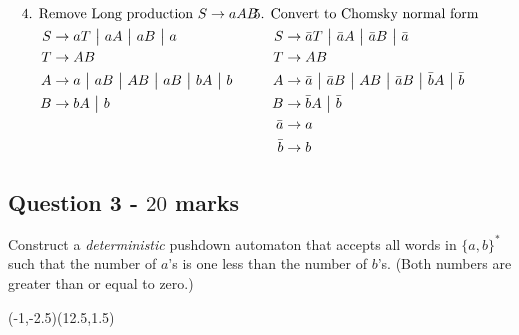 \documentclass[12pt]{article}
\begin{document}
\begin{align*}
& & &\\
&\hspace{-.75cm}\text{4. Remove Long production $S \rightarrow aAB$} & &\hspace{-.75cm}\text{5. Convert to Chomsky normal form}\\
S & \rightarrow aT \BAR aA \BAR aB \BAR a	&  S & \rightarrow \bar{a}T \BAR \bar{a}A \BAR \bar{a}B \BAR \bar{a} \\
T & \rightarrow AB												&  T & \rightarrow AB \\
A &\rightarrow a \BAR aB \BAR AB \BAR aB \BAR bA \BAR b		&  A &\rightarrow \bar{a} \BAR \bar{a}B \BAR AB \BAR \bar{a}B \BAR \bar{b}A \BAR \bar{b} \\
B & \rightarrow bA \BAR b				&  B &\rightarrow \bar{b}A \BAR \bar{b} \\
&									&  \bar{a} &\rightarrow a \\
&									&  \bar{b} &\rightarrow b
\end{align*}



\clearpage
\subsection*{Question 3 - $20$ marks}
Construct a \emph{deterministic} pushdown automaton that accepts all words in $\{a,b\}^*$ such that the number of $a$'s is one less than the number of $b$'s. (Both numbers are greater than or equal to zero.)

\begin{center}
\begin{VCPicture}{(-1,-2.5)(12.5,1.5)}
\SmallState
{}   







\end{VCPicture}
\end{center}
\end{document}
